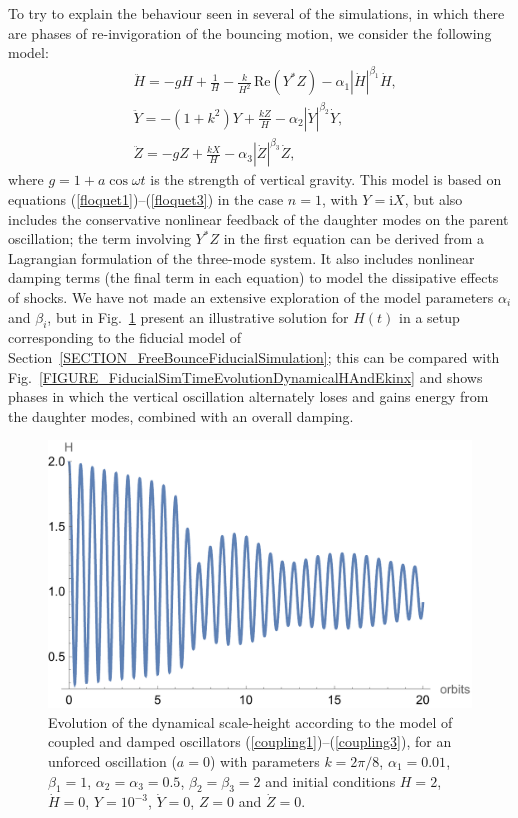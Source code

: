 \documentclass[fleqn,usenatbib]{mnras}
\newcommand{\ii}{\mathrm{i}}
\begin{document}
To try to explain the behaviour seen in several of the simulations, in which there are phases of re-invigoration of the bouncing motion, we consider the following model:
\begin{align}
  &\ddot H=-gH+\frac{1}{H}-\frac{k}{H^2}\,\text{Re}\left(Y^*Z\right)-\alpha_1|\dot H|^{\beta_1}\dot H,\label{coupling1}\\
  &\ddot Y=-(1+k^2)Y+\frac{kZ}{H}-\alpha_2|\dot Y|^{\beta_2}\dot Y,\label{coupling2}\\
  &\ddot Z=-gZ+\frac{kX}{H}-\alpha_3|\dot Z|^{\beta_3}\dot Z,\label{coupling3}
\end{align}
where $g=1+a\cos\omega t$ is the strength of vertical gravity. This model is based on equations (\ref{floquet1})--(\ref{floquet3}) in the case $n=1$, with $Y=\ii X$, but also includes the conservative nonlinear feedback of the daughter modes on the parent oscillation; the term involving $Y^*Z$ in the first equation can be derived from a Lagrangian formulation of the three-mode system. It also includes nonlinear damping terms (the final term in each equation) to model the dissipative effects of shocks. We have not made an extensive exploration of the model parameters $\alpha_i$ and $\beta_i$, but in Fig.~\ref{FIGURE_Coupling_Model} present an illustrative solution for $H(t)$ in a setup corresponding to the fiducial model of Section~\ref{SECTION_FreeBounceFiducialSimulation}; this can be compared with Fig.~\ref{FIGURE_FiducialSimTimeEvolutionDynamicalHAndEkinx} and shows phases in which the vertical oscillation alternately loses and gains energy from the daughter modes, combined with an overall damping.

\begin{figure}
\centering
\includegraphics[scale=0.45]{Figures/figure_coupling_model.pdf}
\caption{Evolution of the dynamical scale-height according to the model of coupled and damped oscillators (\ref{coupling1})--(\ref{coupling3}), for an unforced oscillation ($a=0$) with parameters $k=2\pi/8$, $\alpha_1=0.01$, $\beta_1=1$, $\alpha_2=\alpha_3=0.5$, $\beta_2=\beta_3=2$ and initial conditions $H=2$, $\dot H=0$, $Y=10^{-3}$, $\dot Y=0$, $Z=0$ and $\dot Z=0$.}
\label{FIGURE_Coupling_Model}
\end{figure}
\end{document}
